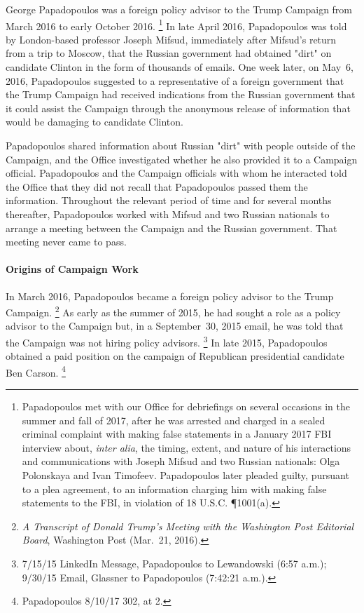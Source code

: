George Papadopoulos was a foreign policy advisor to the Trump Campaign from March 2016 to early October 2016.%
\footnote{Papadopoulos met with our Office for debriefings on several occasions in the summer and fall of 2017, after he was arrested and charged in a sealed criminal complaint with making false statements in a January 2017 FBI interview about, \textit{inter alia}, the timing, extent, and nature of his interactions and communications with Joseph Mifsud and two Russian nationals: Olga Polonskaya and Ivan Timofeev.
Papadopoulos later pleaded guilty, pursuant to a plea agreement, to an information charging him with making false statements to the FBI, in violation of 18 U.S.C. \P 1001(a).}
In late April 2016, Papadopoulos was told by London-based professor Joseph Mifsud, immediately after Mifsud's return from a trip to Moscow, that the Russian government had obtained "dirt" on candidate Clinton in the form of thousands of emails.
One week later, on May~6, 2016, Papadopoulos suggested to a representative of a foreign government that the Trump Campaign had received indications from the Russian government that it could assist the Campaign through the anonymous release of information that would be damaging to candidate Clinton.

Papadopoulos shared information about Russian "dirt" with people outside of the Campaign, and the Office investigated whether he also provided it to a Campaign official.
Papadopoulos and the Campaign officials with whom he interacted told the Office that they did not recall that Papadopoulos passed them the information.
Throughout the relevant period of time and for several months thereafter, Papadopoulos worked with Mifsud and two Russian nationals to arrange a meeting between the Campaign and the Russian government.
That meeting never came to pass.

\paragraph{Origins of Campaign Work}

In March 2016, Papadopoulos became a foreign policy advisor to the Trump Campaign.%
\footnote{\textit{A Transcript of Donald Trump's Meeting with the Washington Post Editorial Board}, Washington Post (Mar.~21, 2016).}
As early as the summer of 2015, he had sought a role as a policy advisor to the Campaign but, in a September~30, 2015 email, he was told that the Campaign was not hiring policy advisors.%
\footnote{7/15/15 LinkedIn Message, Papadopoulos to Lewandowski (6:57 a.m.); 9/30/15 Email, Glassner to Papadopoulos (7:42:21 a.m.).}
In late 2015, Papadopoulos obtained a paid position on the campaign of Republican presidential candidate Ben Carson.%
\footnote{Papadopoulos 8/10/17 302, at 2.}

